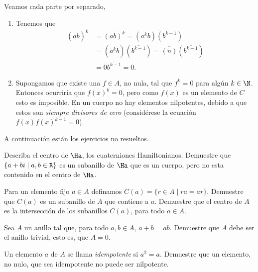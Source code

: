 \begin{sol} Veamos cada parte por separado,
	\begin{enumerate}
		\item Tenemos que \begin{align*}
		(\overline{ab})^k &= \overline{(ab)^k} = \overline{(a^kb)(b^{k-1})} \\
		&= (\overline{a^kb}) (\overline{b^{k-1}}) = \overline{(n)} (\overline{b^{k-1}}) \\
		&=  0\overline{b^{k-1}} = 0.
		\end{align*}
		\item Supongamos que existe una $f \in A$, no nula, tal que $f^k = 0$ para algún $k \in \N$. Entonces ocurriría que $f(x)^k = 0$, pero como $f(x)$ es un elemento de $C$ esto es imposible. En un cuerpo no hay elementos nilpotentes, debido a que estos son \textit{siempre divisores de cero} (considérese la ecuación $f(x)f(x)^{k-1} = 0$). 
	\end{enumerate}
\end{sol}
%
A continuación están los ejercicios no resueltos.
\begin{ejer} 
	Describa el centro de $\Ha$, los cuaterniones Hamiltonianos. Demuestre que $\{a+bi\mid a,b \in \texttt{R} \}$ es un subanillo de $\Ha$ que es un cuerpo, pero no esta contenido en el centro de $\Ha$.
\end{ejer} 
\begin{ejer} 
		Para un elemento fijo $a \in A$ definamos $C(a) = \{r \in A\mid ra=ar\}$. Demuestre que $C(a)$ es un subanillo de $A$ que contiene a $a$. Demuestre que el centro de $A$ es la intersección de los subanillos $C(a)$, para todo $a \in A$.
\end{ejer} 
\begin{ejer} 
		Sea $A$ un anillo tal que, para todo $a,b \in A$, $a+b=ab$. Demuestre que $A$ debe ser el anillo trivial, esto es, que $A = 0$.
\end{ejer} 
\begin{ejer} 
		Un elemento $a$ de $A$ se llama \textit{idempotente} si $a^2 = a$. Demuestre que un elemento, no nulo, que sea idempotente no puede ser nilpotente\footnotemark.
\end{ejer} 
